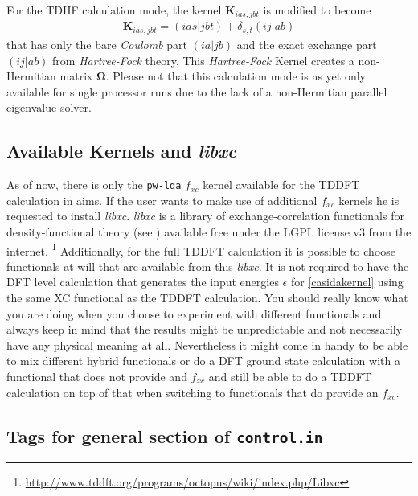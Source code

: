For the TDHF calculation mode, the kernel $\mathbf{K}_{ias,jbt}$ is modified to become
\begin{align}\label{tdhfcalcmode}
\mathbf{K}_{ias,jbt} = (ias|jbt) + \delta_{s,t}(ij|ab)
\end{align}
that has only the bare {\em Coulomb} part $(ia|jb)$ and the exact exchange part $(ij|ab)$ from {\em Hartree-Fock} theory. This {\em Hartree-Fock} Kernel 
creates a non-Hermitian matrix $\mathbf{\Omega}$. Please not that this calculation mode
is as yet only available for single processor runs due to the lack of a non-Hermitian parallel eigenvalue solver.

\subsection*{Available Kernels and \textit{libxc}}
As of now, there is only the \texttt{pw-lda} $f_{xc}$ kernel available for the TDDFT calculation in aims. If the user wants to make use of
additional $f_{xc}$ kernels he is requested to install \textit{libxc}. \textit{libxc} is a library of exchange-correlation functionals for 
density-functional theory (see \cite{libxcpaper12}) available free under the LGPL license v3 from the internet.
\footnote{\url{http://www.tddft.org/programs/octopus/wiki/index.php/Libxc}} 
Additionally, for the full TDDFT calculation it is possible to choose functionals at will that are available from this {\em libxc}. It is not required to
have the DFT level calculation that generates the input energies $\epsilon$ for \ref{casidakernel} using the same XC functional as the TDDFT calculation.
You should really know what you are doing when you choose to experiment with different functionals and always keep in mind that the results might be
unpredictable and not necessarily have any physical meaning at all. Nevertheless it might come in handy to be able to mix different hybrid functionals
or do a DFT ground state calculation with a functional that does not provide and $f_{xc}$ and still be able to do a TDDFT calculation on top of that
when switching to functionals that do provide an $f_{xc}$.

\subsection*{Tags for general section of \texttt{control.in}}

